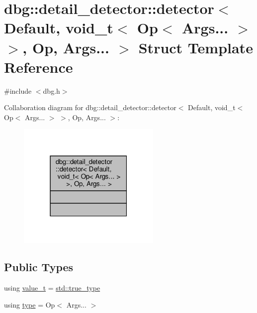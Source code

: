 \hypertarget{structdbg_1_1detail__detector_1_1detector_3_01Default_00_01void__t_3_01Op_3_01Args_8_8_8_01_4_01_4_00_01Op_00_01Args_8_8_8_01_4}{}\section{dbg\+:\+:detail\+\_\+detector\+:\+:detector$<$ Default, void\+\_\+t$<$ Op$<$ Args... $>$ $>$, Op, Args... $>$ Struct Template Reference}
\label{structdbg_1_1detail__detector_1_1detector_3_01Default_00_01void__t_3_01Op_3_01Args_8_8_8_01_4_01_4_00_01Op_00_01Args_8_8_8_01_4}


{\ttfamily \#include $<$dbg.\+h$>$}



Collaboration diagram for dbg\+:\+:detail\+\_\+detector\+:\+:detector$<$ Default, void\+\_\+t$<$ Op$<$ Args... $>$ $>$, Op, Args... $>$\+:\nopagebreak
\begin{figure}[H]
\begin{center}
\leavevmode
\includegraphics[width=195pt]{d5/d59/structdbg_1_1detail__detector_1_1detector_3_01Default_00_01void__t_3_01Op_3_01Args_8_8_8_01_4_010a7eb40f65b9d8d3493151bfdc3019fa}
\end{center}
\end{figure}
\subsection*{Public Types}
\begin{DoxyCompactItemize}
\item 
using \hyperlink{structdbg_1_1detail__detector_1_1detector_3_01Default_00_01void__t_3_01Op_3_01Args_8_8_8_01_4_01_4_00_01Op_00_01Args_8_8_8_01_4_ab9dc20c0565be267d2d98b0e0f4a565b}{value\+\_\+t} = \hyperlink{namespacestd_a6a860513044e23d34e553ea986e83fa1}{std\+::true\+\_\+type}
\item 
using \hyperlink{structdbg_1_1detail__detector_1_1detector_3_01Default_00_01void__t_3_01Op_3_01Args_8_8_8_01_4_01_4_00_01Op_00_01Args_8_8_8_01_4_a2119ba35e684b8292286546a1cea10d1}{type} = Op$<$ Args... $>$
\end{DoxyCompactItemize}


